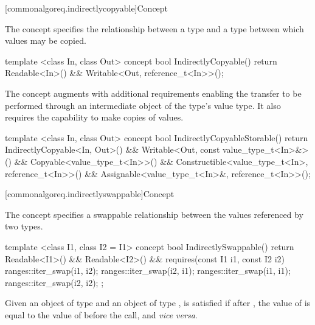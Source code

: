 [commonalgoreq.indirectlycopyable]{Concept }

\pnum
The  concept specifies the relationship between a 
type and a  type between which values may be copied.

%
\begin{codeblock}
  template <class In, class Out>
  concept bool IndirectlyCopyable() {
    return Readable<In>() &&
      Writable<Out, reference_t<In>>();
  }
\end{codeblock}

\pnum
The  concept augments  with additional
requirements enabling the transfer to be performed through an intermediate object of the
 type's value type. It also requires the capability to make copies of values.

%
\begin{codeblock}
  template <class In, class Out>
  concept bool IndirectlyCopyableStorable() {
    return IndirectlyCopyable<In, Out>() &&
      Writable<Out, const value_type_t<In>&>() &&
      Copyable<value_type_t<In>>() &&
      Constructible<value_type_t<In>, reference_t<In>>() &&
      Assignable<value_type_t<In>&, reference_t<In>>();
  }
\end{codeblock}

[commonalgoreq.indirectlyswappable]{Concept }

\pnum
The  concept specifies a swappable relationship between the
values referenced by two  types.

%
\begin{codeblock}
  template <class I1, class I2 = I1>
  concept bool IndirectlySwappable() {
    return Readable<I1>() && Readable<I2>() &&
      requires(const I1 i1, const I2 i2) {
        ranges::iter_swap(i1, i2);
        ranges::iter_swap(i2, i1);
        ranges::iter_swap(i1, i1);
        ranges::iter_swap(i2, i2);
      };
  }
\end{codeblock}

\pnum
Given an object  of type  and an object  of
type ,  is satisfied if after
, the value of  is equal to the
value of  before the call, and \textit{vice versa}.

